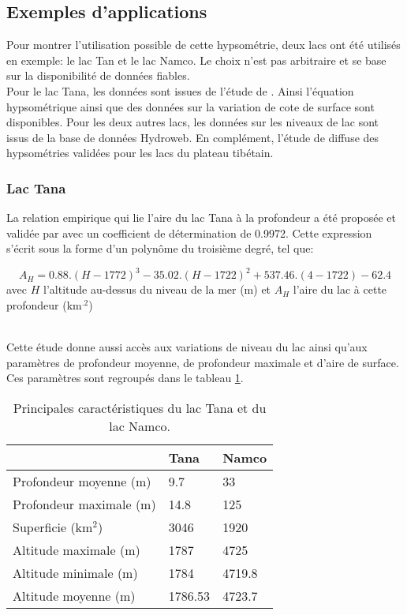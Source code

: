 \subsection{{\selectfont Exemples d'applications}}

Pour montrer l'utilisation possible de cette hypsométrie, deux lacs ont été utilisés en exemple: le lac Tan et le lac Namco. Le choix n'est pas arbitraire et se base sur la disponibilité de données fiables. \\
Pour le lac Tana, les données sont issues de l'étude de \citet{kebedew2020}. Ainsi l'équation hypsométrique ainsi que des données sur la variation de cote de surface sont disponibles. Pour les deux autres lacs, les données sur les niveaux de lac sont issus de la base de données Hydroweb. En complément, l'étude de \citet{li2019} diffuse des hypsométries validées pour les lacs du plateau tibétain.\\

\subsubsection*{{\selectfont Lac Tana}}
\noindent La relation empirique qui lie l'aire du lac Tana à la profondeur a été proposée et validée par \citet{kebedew2020} avec un coefficient de détermination de 0.9972. Cette expression s'écrit sous la forme d'un polynôme du troisième degré, tel que:

\begin{equation}
A_{H} = 0.88.(H-1772)^{3}-35.02.(H-1722)^{2}+537.46.(4-1722)-62.4
\end{equation}
avec $H$ l'altitude au-dessus du niveau de la mer (m) et $A_{H}$ l'aire du lac à cette profondeur (km$^{.2}$)

~\\

\noindent Cette étude donne aussi accès aux variations de niveau du lac ainsi qu'aux paramètres de profondeur moyenne, de profondeur maximale et d'aire de surface. Ces paramètres sont regroupés dans le tableau \ref{carac_lacs_hypso}.\\

\begin{table}[h!]
 \caption{Principales caractéristiques du lac Tana et du lac Namco.}
 \label{carac_lacs_hypso}
 \begin{tabularx}{\textwidth}{XXX}
 \hline
  & Tana & Namco \\
 \hline
  Profondeur moyenne (m)&9.7&33\\
  Profondeur maximale (m)&14.8&125\\
  Superficie (km$^{2}$)&3046&1920\\
  Altitude maximale (m)&1787&4725\\
  Altitude minimale (m)&1784&4719.8\\
  Altitude moyenne (m)&1786.53&4723.7\\
  \hline
 \end{tabularx}
\end{table}

